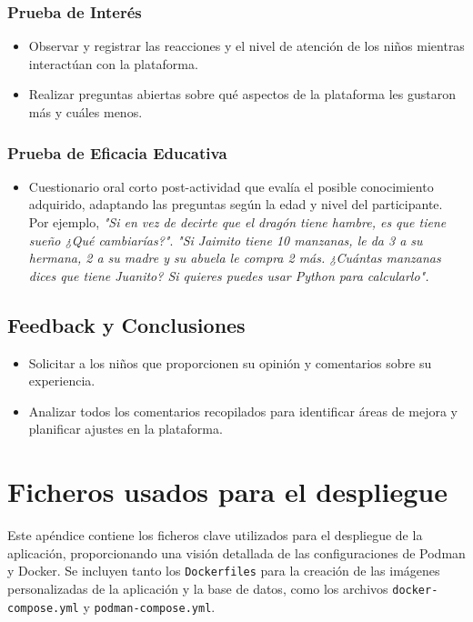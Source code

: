 \begin{appendices}
\subsection*{Prueba de Interés}
\begin{itemize}
    \item Observar y registrar las reacciones y el nivel de atención de los niños mientras interactúan con la plataforma.
    \item Realizar preguntas abiertas sobre qué aspectos de la plataforma les gustaron más y cuáles menos.
\end{itemize}

\subsection*{Prueba de Eficacia Educativa}
\begin{itemize}
    \item Cuestionario oral corto post-actividad que evalía el posible conocimiento adquirido, adaptando las preguntas según la edad y nivel del participante. Por ejemplo, \textit{"Si en vez de decirte que el dragón tiene hambre, es que tiene sueño ¿Qué cambiarías?"}. \textit{"Si Jaimito tiene 10 manzanas, le da 3 a su hermana, 2 a su madre y su abuela le compra 2 más. ¿Cuántas manzanas dices que tiene Juanito? Si quieres puedes usar Python para calcularlo".}
\end{itemize}

\section{Feedback y Conclusiones}
\begin{itemize}
    \item Solicitar a los niños que proporcionen su opinión y comentarios sobre su experiencia.
    \item Analizar todos los comentarios recopilados para identificar áreas de mejora y planificar ajustes en la plataforma.
\end{itemize}

\chapter{Ficheros usados para el despliegue} \label{podmananddockerfile}

Este apéndice contiene los ficheros clave utilizados para el despliegue de la aplicación, proporcionando una visión detallada de las configuraciones de Podman y Docker. Se incluyen tanto los \texttt{Dockerfiles} para la creación de las imágenes personalizadas de la aplicación y la base de datos, como los archivos \texttt{docker-compose.yml} y \texttt{podman-compose.yml}.


\end{appendices}
